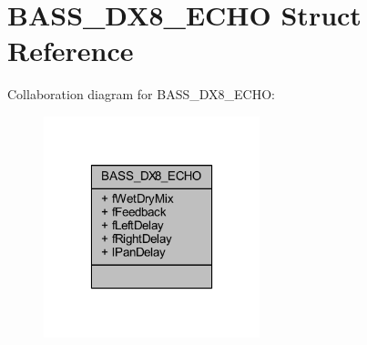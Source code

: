 \hypertarget{struct_b_a_s_s___d_x8___e_c_h_o}{\section{B\-A\-S\-S\-\_\-\-D\-X8\-\_\-\-E\-C\-H\-O Struct Reference}
\label{struct_b_a_s_s___d_x8___e_c_h_o}
}


Collaboration diagram for B\-A\-S\-S\-\_\-\-D\-X8\-\_\-\-E\-C\-H\-O\-:\nopagebreak
\begin{figure}[H]
\begin{center}
\leavevmode
\includegraphics[width=178pt]{struct_b_a_s_s___d_x8___e_c_h_o__coll__graph}
\end{center}
\end{figure}
